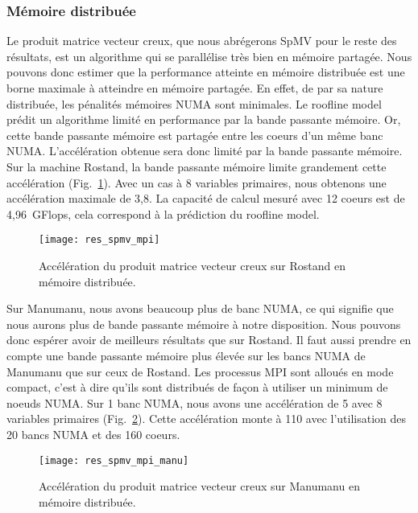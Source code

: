 \subsubsection{Mémoire distribuée}
Le produit matrice vecteur creux, que nous abrégerons SpMV pour le reste des résultats, est un algorithme qui se parallélise très bien en mémoire partagée.
%
Nous pouvons donc estimer que la performance atteinte en mémoire distribuée est une borne maximale à atteindre en mémoire partagée.
%
En effet, de par sa nature distribuée, les pénalités mémoires NUMA sont minimales.
%
Le roofline model prédit un algorithme limité en performance par la bande passante mémoire.
%
Or, cette bande passante mémoire est partagée entre les coeurs d'un même banc NUMA.
%
L'accélération obtenue sera donc limité par la bande passante mémoire.
%
Sur la machine Rostand, la bande passante mémoire limite grandement cette accélération (Fig.~\ref{fig:res_spmv_mpi_rostand}).
%
Avec un cas à 8 variables primaires, nous obtenons une accélération maximale de 3,8.
%
La capacité de calcul mesuré avec 12 coeurs est de 4,96~GFlops, cela correspond à la prédiction du roofline model.


\begin{figure}[t!]
  \centering
  \texttt{[image: res\_spmv\_mpi]}
  \caption{Accélération du produit matrice vecteur creux sur Rostand en mémoire distribuée.}
  \label{fig:res_spmv_mpi_rostand}
\end{figure}



Sur Manumanu, nous avons beaucoup plus de banc NUMA, ce qui signifie que nous aurons plus de bande passante mémoire à notre disposition.
%
Nous pouvons donc espérer avoir de meilleurs résultats que sur Rostand.
%
Il faut aussi prendre en compte une bande passante mémoire plus élevée sur les bancs NUMA de Manumanu que sur ceux de Rostand.
%
Les processus MPI sont alloués en mode compact, c'est à dire qu'ils sont distribués de façon à utiliser un minimum de noeuds NUMA.
%
Sur 1 banc NUMA, nous avons une accélération de 5 avec 8 variables primaires (Fig.~\ref{fig:res_spmv_mpi_manumanu}).
%
Cette accélération monte à 110 avec l'utilisation des 20 bancs NUMA et des 160 coeurs.


\begin{figure}[t!]
  \centering
  \texttt{[image: res\_spmv\_mpi\_manu]}
  \caption{Accélération du produit matrice vecteur creux sur Manumanu en mémoire distribuée.}
  \label{fig:res_spmv_mpi_manumanu}
\end{figure}
